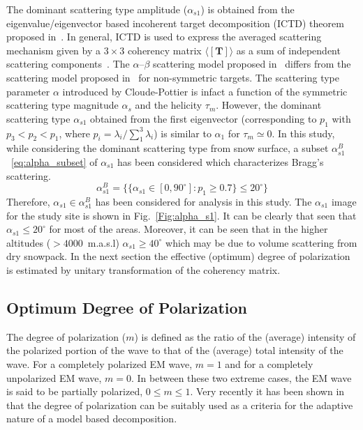 The dominant scattering type amplitude ($\alpha_{s1}$) is obtained from the eigenvalue/eigenvector based incoherent target decomposition (ICTD) theorem proposed in~\cite{TOUZI2007}. In general, ICTD is used to express the averaged scattering mechanism given by a $3\times3$ coherency matrix $\langle[{\mathbf{T}}]\rangle$ as a sum of independent scattering components~\cite{Cloude92NATO,Cloude96,TOUZI2007}. The $\alpha$--$\beta$ scattering model proposed in~\cite{Cloude96} differs from the scattering model proposed in~\cite{TOUZI2007} for non-symmetric targets. The scattering type parameter $\alpha$ introduced by Cloude-Pottier is infact a function of the symmetric scattering type magnitude $\alpha_{s}$ and the helicity $\tau_{m}$. However, the dominant scattering type $\alpha_{s1}$ obtained from the first eigenvector (corresponding to $p_{1}$ with $p_{3}<p_{2}<p_{1}$, where $p_{i}=\lambda_{i}/\sum_{1}^{3}\lambda_{i}$) is similar to $\alpha_{1}$ for $\tau_{m}\simeq0$. In this study, while considering the dominant scattering type from snow surface, a subset $\alpha_{s1}^{B}$~\eqref{eq:alpha_subset} of $\alpha_{s1}$ has been considered which characterizes Bragg's scattering. 
\begin{equation}
\alpha_{s1}^{B}=\Big\{\{\alpha_{s1} \in [0,90^\circ]: p_{1}\ge 0.7\} \le 20^\circ\Big\}
\label{eq:alpha_subset}
\end{equation}
Therefore, $\alpha_{s1} \in \alpha_{s1}^{B}$ has been considered for analysis in this study. The $\alpha_{s1}$ image for the study site is shown in Fig.~\ref{Fig:alpha_s1}. It can be clearly that seen that $\alpha_{s1} \le 20^\circ$ for most of the areas. Moreover, it can be seen that in the higher altitudes ($> 4000$~m.a.s.l) $\alpha_{s1} \ge 40^\circ$ which may be due to volume scattering from dry snowpack. In the next section the effective (optimum) degree of polarization is estimated by unitary transformation of the coherency matrix. 

\subsection{Optimum Degree of Polarization}
The degree of polarization ($m$) is defined as the ratio of the (average) intensity of the polarized portion of the wave to that of the (average) total intensity of the wave. For a completely polarized EM wave, $m = 1$ and for a completely unpolarized EM wave, $m = 0$. In between these two extreme cases, the EM wave is said to be partially polarized, $0 \le m \le 1$. Very recently it has been shown in~\cite{Bhattacharya15} that the degree of polarization can be suitably used as a criteria for the adaptive nature of a model based decomposition. 

